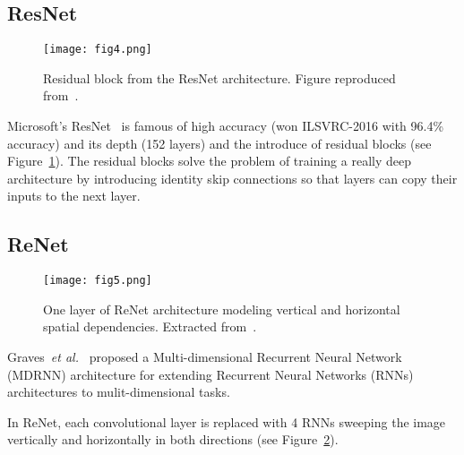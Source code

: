 \documentclass[10pt,twocolumn,letterpaper]{article}
\begin{document}
	\subsection*{ResNet}
	\begin{figure}[h]
		\centering
		\texttt{[image: fig4.png]}
		\caption{Residual block from the ResNet architecture. Figure reproduced from~\cite{He2016Deep}.} \label{fig4}
	\end{figure}
	Microsoft's ResNet~\cite{He2016Deep} is famous of high accuracy (won ILSVRC-2016 with 96.4\% accuracy) and its depth (152 layers) and the introduce of residual blocks (see Figure~\ref{fig4}). The residual blocks solve the problem of training a really deep architecture by introducing identity skip connections so that layers can copy their inputs to the next layer.
	\subsection*{ReNet}
	\begin{figure}[h]
		\centering
		\texttt{[image: fig5.png]}
		\caption{One layer of ReNet architecture modeling vertical and horizontal spatial dependencies. Extracted from~\cite{VisinKCMCB15}.}
		\label{fig5}
	\end{figure}
	Graves~\emph{et al.}~\cite{Graves2007Multi} proposed a Multi-dimensional Recurrent Neural Network (MDRNN) architecture for extending Recurrent Neural Networks (RNNs) architectures to mulit-dimensional tasks.
	\par
	In ReNet, each convolutional layer is replaced with 4 RNNs sweeping the image vertically and horizontally in both directions (see Figure~\ref{fig5}).
	{\small
		
		
	}
\end{document}

